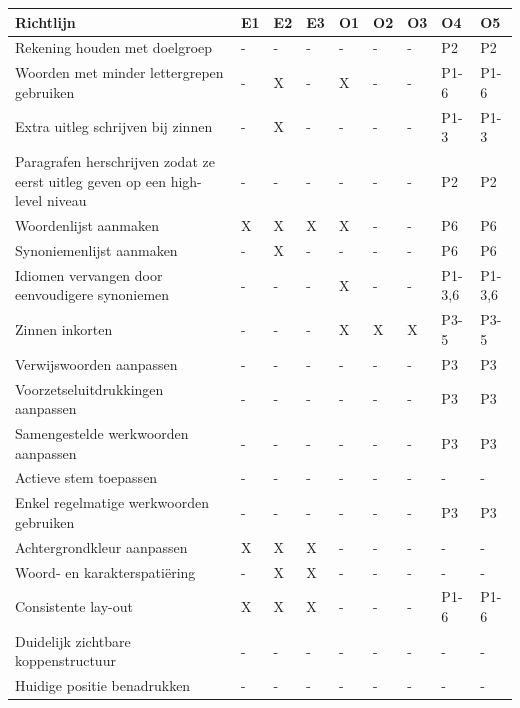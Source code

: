 \medspace


\begin{table}[H]
	\centering
	\begin{tabular}{ | m{8cm} | m{0.5cm} | m{0.5cm} | m{0.5cm} | m{0.5cm} | m{0.5cm} | m{0.5cm} | m{1cm} | m{1cm} | }
		\hline
		\textbf{Richtlijn} & \textbf{E1} & \textbf{E2} & \textbf{E3} & \textbf{O1} & \textbf{O2} & \textbf{O3} & \textbf{O4} & \textbf{O5} \\ \hline
		Rekening houden met doelgroep & - & - & - & - & - & - & P2 & P2 \\ \hline
		Woorden met minder lettergrepen gebruiken & - & X & - & X & - & - & P1-6 & P1-6 \\ \hline
		Extra uitleg schrijven bij zinnen & - & X & - & - & - & - & P1-3 & P1-3 \\ \hline
		Paragrafen herschrijven zodat ze eerst uitleg geven op een high-level niveau & - & - & - & - & - & - & P2 & P2 \\ \hline
		Woordenlijst aanmaken & X & X & X & X & - & - & P6 & P6 \\ \hline
		Synoniemenlijst aanmaken & - & X & - & - & - & - & P6 & P6 \\ \hline
		Idiomen vervangen door eenvoudigere synoniemen & - & - & - & X & - & - & P1-3,6 & P1-3,6 \\ \hline
		Zinnen inkorten & - & - & - & X & X & X & P3-5 & P3-5 \\ \hline
		Verwijswoorden aanpassen & - & - & - & - & - & - & P3 & P3 \\ \hline
		Voorzetseluitdrukkingen aanpassen & - & - & - & - & - & - & P3 & P3 \\ \hline
		Samengestelde werkwoorden aanpassen & - & - & - & - & - & - & P3 & P3 \\ \hline
		Actieve stem toepassen & - & - & - & - & - & - & - & - \\ \hline
		Enkel regelmatige werkwoorden gebruiken & - & - & - & - & - & - & P3 & P3 \\ \hline
		Achtergrondkleur aanpassen & X & X & X & - & - & - & - & - \\ \hline
		Woord- en karakterspatiëring & - & X & X & - & - & - & - & - \\ \hline
		Consistente lay-out & X & X & X & - & - & - & P1-6 & P1-6 \\ \hline
		Duidelijk zichtbare koppenstructuur & - & - & - & - & - & - & - & - \\ \hline
		Huidige positie benadrukken & - & - & - & - & - & - & - & - \\ \hline

\end{tabular}
\end{table}
